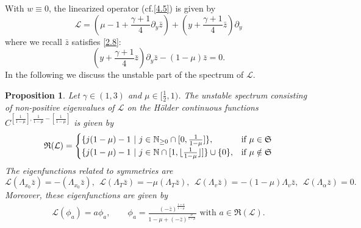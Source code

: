 \documentclass{article}
\newcommand{\ga}{\gamma}
\newcommand{\al}{\alpha}
\newcommand{\pa}{\partial}
\def\be{\begin{equation}}
\def\ee{\end{equation}}
\def\ssmu{\mathfrak S}
\numberwithin{equation}{section}
\newtheorem{proposition}[theorem]{Proposition}
\begin{document}
With $w\equiv 0$, the linearized operator (cf.\eqref{4.5}) is given by 
\be
    \mathcal L = (\mu-1+\frac{\ga+1}{4}\pa_y \bar z)+(y+\frac{\ga+1}{4}\bar z)\pa_y
\ee
where we recall $\bar z$ satisfies \eqref{2.8}: 
\[
       (y+\frac{\ga+1}{4}\bar z)\pa_y \bar z- (1-\mu)\bar z =0.
\]
In the following we discuss the unstable part of the spectrum of $\mathcal L$.  
\begin{proposition}\label{trivial mode}
    Let $\ga\in(1,3)$ and $\mu\in[\frac12,1)$.  %
    The unstable spectrum consisting of non-positive eigenvalues of $\mathcal L$ %
    on the H\"{o}lder continuous functions $C^{[\frac{1}{1-\mu}], \frac{1}{1-\mu} - [\frac{1}{1-\mu}]}%
    $ is given by  %
    \be\notag 
            \mathfrak R(\mathcal L) = 
            \begin{cases}
            \{j (1-\mu)-1 \ | \ j\in \mathbb{N}_{\ge 0}\cap [0,\frac{1}{1-\mu} ]  \}, & \text{if } \mu \in \ssmu  \\ %
            \{j (1-\mu)-1 \ | \ j\in \mathbb{N} \cap [1, \lfloor\frac{1}{1-\mu}\rfloor ] \} \cup \{0\}, & \text{if } \mu \notin \ssmu 
            \end{cases}
    \ee
    The eigenfunctions related to symmetries are 
    \be\label{5.17}
         \mathcal L(\Lambda_{x_0} \bar z) = -(\Lambda_{x_0} \bar z),\ \ \mathcal L(\Lambda_{T} \bar z) = -\mu (\Lambda_{T} \bar z),\ \  \mathcal L(\Lambda_{v} \bar z) = - (1-\mu)\Lambda_{v} \bar z,\ \ \mathcal L(\Lambda_\al \bar z)=0. 
    \ee 
    Moreover, these eigenfunctions are given by
    \begin{align}\label{eigenfunction}
        \mathcal L(\phi_a) = a \phi_a,\qquad \phi_a = \frac{(-\bar z)^{\frac{1+a}{1-\mu}}}{1-\mu+(-\bar z )^{\frac{\mu}{1-\mu}}}\text{ with } a \in \mathfrak R(\mathcal L).
    \end{align}
\end{proposition}   
\end{document}
